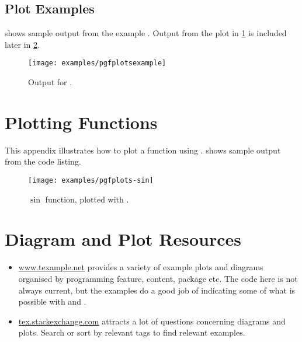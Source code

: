 \subsection<1-| beamer:0>{Plot Examples}\label{subsec:samples-plots}
 shows sample output from the \pgfplots{} example .
Output from the plot in \cref{sec:fn} is included later in \cref{fig:sin}.
\begin{figure}
  \centering\texttt{[image: examples/pgfplotsexample]}
  \caption{Output for .}\label{fig:pgfplotsexample}
\end{figure}


\section<1-| beamer:0>{Plotting Functions}\label{sec:fn}

This appendix illustrates how to plot a function using \pgfplots.
 shows sample output from the code listing.


\begin{figure}
  \centering
  \texttt{[image: examples/pgfplots-sin]}
  \caption{$\sin$ function, plotted with \protect\pgfplots.}\label{fig:sin}
\end{figure}

\section<1-| beamer:0>{Diagram and Plot Resources}\label{sec:dpr}

\begin{itemize}
  \item \url{www.texample.net} provides a variety of example plots and diagrams organised by programming feature, content, package etc\@.
  The code here is not always current, but the examples do a good job of indicating some of what is possible with \tikzpgf{} and \pgfplots.
  \item \url{tex.stackexchange.com} attracts a lot of questions concerning diagrams and plots.
  Search or sort by relevant tags to find relevant examples.
\end{itemize}



